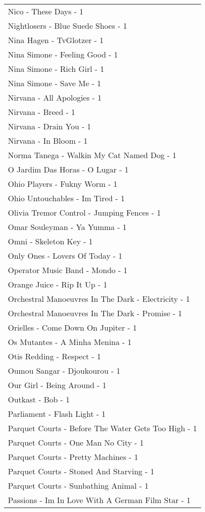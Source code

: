\documentclass[
]{article}
\begin{document}
\begin{longtable}{l}
Nico - These Days - 1 \\ 
Nightlosers - Blue Suede Shoes - 1 \\ 
Nina Hagen - TvGlotzer - 1 \\ 
Nina Simone - Feeling Good - 1 \\ 
Nina Simone - Rich Girl - 1 \\ 
Nina Simone - Save Me - 1 \\ 
Nirvana - All Apologies - 1 \\ 
Nirvana - Breed - 1 \\ 
Nirvana - Drain You - 1 \\ 
Nirvana - In Bloom - 1 \\ 
Norma Tanega - Walkin My Cat Named Dog - 1 \\ 
O Jardim Das Horas - O Lugar - 1 \\ 
Ohio Players - Fukny Worm - 1 \\ 
Ohio Untouchables - Im Tired - 1 \\ 
Olivia Tremor Control - Jumping Fences - 1 \\ 
Omar Souleyman - Ya Yumma - 1 \\ 
Omni - Skeleton Key - 1 \\ 
Only Ones - Lovers Of Today - 1 \\ 
Operator Music Band - Mondo - 1 \\ 
Orange Juice - Rip It Up - 1 \\ 
Orchestral Manoeuvres In The Dark - Electricity - 1 \\ 
Orchestral Manoeuvres In The Dark - Promise - 1 \\ 
Orielles - Come Down On Jupiter - 1 \\ 
Os Mutantes - A Minha Menina - 1 \\ 
Otis Redding - Respect - 1 \\ 
Oumou Sangar - Djoukourou - 1 \\ 
Our Girl - Being Around - 1 \\ 
Outkast - Bob - 1 \\ 
Parliament - Flash Light - 1 \\ 
Parquet Courts - Before The Water Gets Too High - 1 \\ 
Parquet Courts - One Man No City - 1 \\ 
Parquet Courts - Pretty Machines - 1 \\ 
Parquet Courts - Stoned And Starving - 1 \\ 
Parquet Courts - Sunbathing Animal - 1 \\ 
Passions - Im In Love With A German Film Star - 1 \\ 

\end{longtable}
\end{document}
